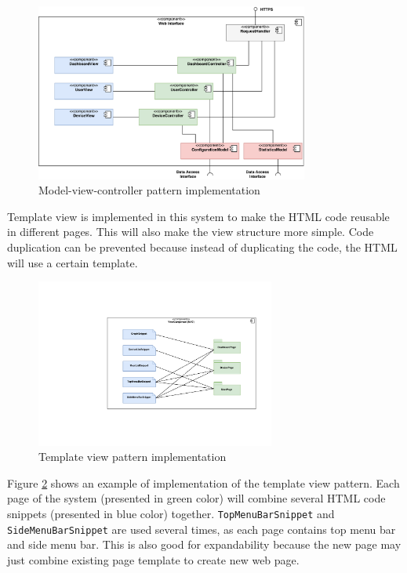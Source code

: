 \begin{figure}[H]
	\centering
	\includegraphics[width=0.8\textwidth]{7-software/images/mvc.pdf}
	\caption{Model-view-controller pattern implementation}
	\label{fig:mvc-architecture}
\end{figure}

\label{sec:template-view}
Template view is implemented in this system to make the HTML code reusable in different pages. This will also make the view structure more simple. Code duplication can be prevented because instead of duplicating the code, the HTML will use a certain template.

\begin{figure}[H]
	\centering
	\includegraphics[width=0.7\textwidth]{7-software/images/template-view.pdf}
	\caption{Template view pattern implementation}
	\label{fig:template-view-architecture}
\end{figure}

Figure \ref{fig:template-view-architecture} shows an example of implementation of the template view pattern. Each page of the system (presented in green color) will combine several HTML code snippets (presented in blue color) together. \texttt{TopMenuBarSnippet} and \texttt{SideMenuBarSnippet} are used several times, as each page contains top menu bar and side menu bar. This is also good for expandability because the new page may just combine existing page template to create new web page.


